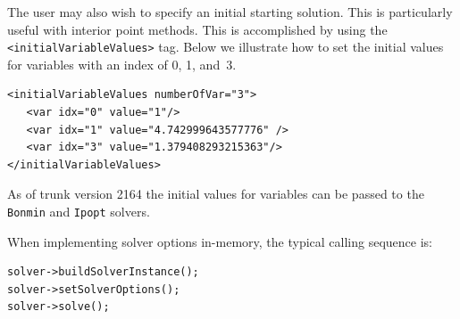 The user may also wish to specify an initial starting solution. This is particularly
useful with interior point methods.  This is accomplished by using the
{\tt <initialVariableValues>} tag.  Below we illustrate how to set the
initial values for variables with an index of 0, 1, and~3.

\begin{verbatim}
<initialVariableValues numberOfVar="3">
   <var idx="0" value="1"/>
   <var idx="1" value="4.742999643577776" />
   <var idx="3" value="1.379408293215363"/>
</initialVariableValues>
\end{verbatim}

As of trunk version 2164 the initial values for variables can be passed
to the {\tt Bonmin} and {\tt Ipopt} solvers.


When implementing solver options in-memory, the typical calling sequence is:

\begin{verbatim}
solver->buildSolverInstance();
solver->setSolverOptions();
solver->solve();
\end{verbatim}



